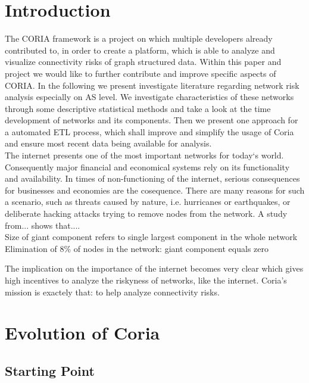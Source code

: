\documentclass[conference]{IEEEtran}
\begin{document}
\section{Introduction}
The CORIA framework is a project on which multiple developers already contributed to, in order to create a platform, which is able to analyze and visualize connectivity risks of graph structured data. Within this paper and project we would like to further contribute and improve specific aspects of CORIA. In the following we present investigate literature regarding network risk analysis especially on AS level. We investigate characteristics of these networks through some descriptive statistical methods and take a look at the time development of networks and its components. Then we present one approach for a automated ETL process, which shall improve and simplify the usage of Coria and ensure most recent data being available for analysis. \\



The internet presents one of the most important networks for today‘s world. Consequently major financial and economical systems rely on its functionality and availability. In times of non-functioning of the internet, serious consequences for businesses and economies are the cosequence. There are many reasons for such a scenario, such as threats caused by nature, i.e. hurricanes or earthquakes, or deliberate hacking attacks trying to remove nodes from the network. 
A study from... shows that.... \\

Size of giant component refers to single largest component in the whole network
Elimination of 8\% of nodes in the network: giant component equals zero


The implication on the importance of the internet becomes very clear which gives high incentives to analyze the riskyness of networks, like the internet. Coria's mission is exactely that: to help analyze connectivity risks. 






\section{Evolution of Coria}
\subsection{Starting Point}
\end{document}
